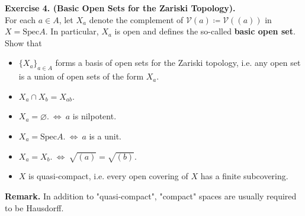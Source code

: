 \documentclass[12pt,a4paper,footinclude=true,headinclude=true]{scrbook} %
\newenvironment{exe}[2][Exercise]
    { \begin{mdframed}[backgroundcolor=gray!20] \textbf{#1 #2.}\\ }
    {  \end{mdframed}}
\begin{document}
\begin{exe}{4. (Basic Open Sets for the Zariski Topology)}
    For each $a\in A$, let $X_a$ denote the complement of $\mathcal{V}(a)\coloneqq\mathcal{V}((a))$ in $X=\mathrm{Spec}A$. In particular, $X_a$ is open and defines the so-called \textbf{basic open set}. Show that 
    \begin{itemize}
        \item[(a)] $\{X_a\}_{a\in A}$ forms a basis of open sets for the Zariski topology, i.e. any open set is a union of open sets of the form $X_a$.
        \item[(b)] $X_a\cap X_b=X_{ab}$.
        \item[(c)] $X_a=\varnothing.\ \Longleftrightarrow\ a$ is nilpotent.
        \item[(d)] $X_a=\mathrm{Spec}A.\ \Longleftrightarrow\ a$ is a unit.
        \item[(e)] $X_a=X_b.\ \Longleftrightarrow\ \sqrt{(a)}=\sqrt{(b)}$.
        \item[(f)] $X$ is quasi-compact, i.e. every open covering of $X$ has a finite subcovering.
    \end{itemize}
    \textbf{Remark.} In addition to "quasi-compact", "compact" spaces are usually required to be Hausdorff.
\end{exe}
\end{document}
